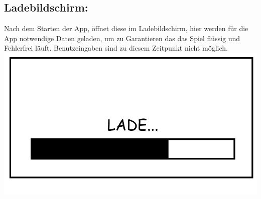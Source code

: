 \documentclass{scrartcl}
\begin{document}
\begin{enumerate}
	\begin{minipage}{1\textwidth}
		\item \subsection*{Ladebildschirm:} \label{appaufbau:Ladebildschirm}
		Nach dem Starten der App, öffnet diese im Ladebildschirm, hier werden für die App notwendige Daten geladen, um zu Garantieren das das Spiel flüssig und Fehlerfrei läuft. Benutzeingaben sind zu diesem Zeitpunkt nicht möglich.\\
		\includegraphics[width=\textwidth]{assets/LoadScreen}
	\end{minipage}
	
	\begin{minipage}{1\textwidth}
		

\end{minipage}
\end{enumerate}
\end{document}
